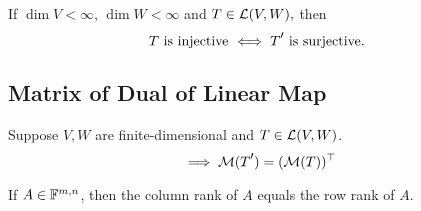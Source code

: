 \begin{thm} 
    If $\dim V < \infty$, $\dim W<\infty$ and $T \in \mathcal{L} (V,W),$ then
    \begin{equation}
      T $ is injective $ \iff \dual{T} $ is surjective. $
    \end{equation}
\end{thm}

\subsection{Matrix of Dual of Linear Map}

\setcounter{thm}{131}
\begin{thm}
  Suppose $V, W$ are finite-dimensional and $T \in \mathcal{L}(V,W)$.
  \begin{equation}
    \implies \mmatrix(\dual{T}) = (\mmatrix(T))^{\top}
  \end{equation}
\end{thm}

\begin{thm}
  If $A \in \mathbb{F}^{m,n}$, then the column rank of $A$ equals the row rank of $A$.
\end{thm}